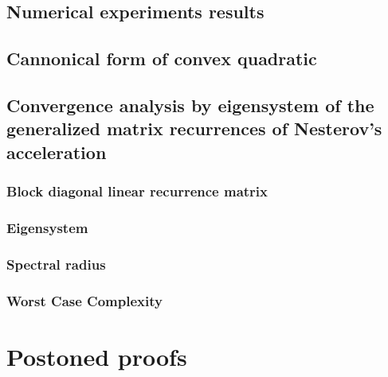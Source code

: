 \documentclass[12pt]{article}
\begin{document}
    \subsection{Numerical experiments results}\label{sec:results-numerical-experiment}
    
    \subsection{Cannonical form of convex quadratic}\label{sec:cannonical-convex-quadratic}
    
    \subsection{Convergence analysis by eigensystem of the generalized matrix recurrences of Nesterov's acceleration}\label{sec:convergence-by-eigensystem}
        \subsubsection{Block diagonal linear recurrence matrix}
        \subsubsection{Eigensystem}
        \subsubsection{Spectral radius}
        \subsubsection{Worst Case Complexity}








\appendix
\section{Postoned proofs}
\end{document}
